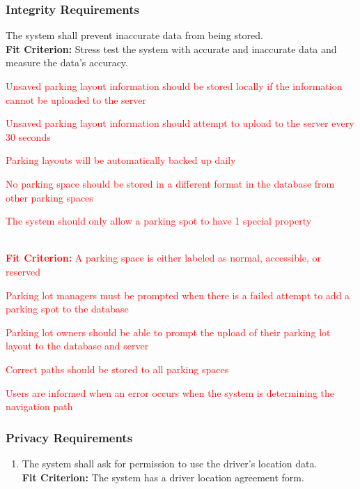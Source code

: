 \documentclass[12pt,letterpaper]{article}
\begin{document}
\subsubsection{Integrity Requirements}
\begin{enumerate}[resume*] 
    \item The system shall prevent inaccurate data from being stored.
    \label{isr4}\\
    \textbf{Fit Criterion:} Stress test the system with accurate and inaccurate
    data and measure the data's accuracy. \textcolor{red}{\item Unsaved parking
    layout information should be stored locally if the information cannot be
    uploaded to the server} \label{isr5} \textcolor{red}{\item Unsaved parking
    layout information should attempt to upload to the server every 30 seconds}
    \label{isr6} \textcolor{red}{\item Parking layouts will be automatically
    backed up daily} \label{isr7} \textcolor{red}{\item No parking space should
    be stored in a different format in the database from other parking spaces}
    \label{isr8} \textcolor{red}{\item The system should only allow a parking
    spot to have 1 special property} \label{isr9}\\
    \textcolor{red}{\textbf{Fit Criterion:} A parking space is either labeled as
    normal, accessible, or reserved} \textcolor{red}{\item Parking lot managers
    must be prompted when there is a failed attempt to add a parking spot to the
    database} \label{isr10} \textcolor{red}{\item Parking lot owners should be
    able to prompt the upload of their parking lot layout to the database and
    server} \label{isr11} \textcolor{red}{\item Correct paths should be stored
    to all parking spaces} \label{isr12} \textcolor{red}{\item Users are
    informed when an error occurs when the system is determining the navigation
    path} \label{isr13}
\end{enumerate}

\subsubsection{Privacy Requirements}
\begin{enumerate}[resume*] 
    \item The system shall ask for permission to use the driver's location
    data.\\
    \textbf{Fit Criterion:} The system has a driver location agreement form.
\end{enumerate}
\end{document}
